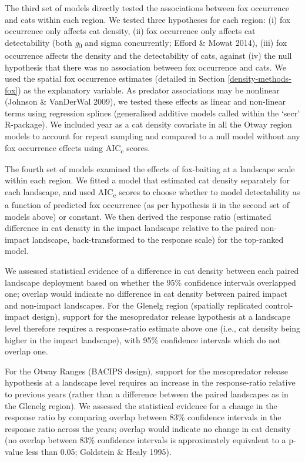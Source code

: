 \documentclass[11pt,a4paper,titlepage,twoside,openright]{style/unimelbthesis}
\begin{document}
\begin{mainmatter}
The third set of models directly tested the associations between fox occurrence and cats within each region. We tested three hypotheses for each region: (i) fox occurrence only affects cat density, (ii) fox occurrence only affects cat detectability (both \emph{g}\textsubscript{0} and sigma concurrently; Efford \& Mowat 2014), (iii) fox occurrence affects the density and the detectability of cats, against (iv) the null hypothesis that there was no association between fox occurrence and cats. We used the spatial fox occurrence estimates (detailed in Section \ref{density-methods-fox}) as the explanatory variable. As predator associations may be nonlinear (Johnson \& VanDerWal 2009), we tested these effects as linear and non-linear terms using regression splines (generalised additive models called within the `secr' R-package). We included year as a cat density covariate in all the Otway region models to account for repeat sampling and compared to a null model without any fox occurrence effects using AIC\textsubscript{c} scores.

The fourth set of models examined the effects of fox-baiting at a landscape scale within each region. We fitted a model that estimated cat density separately for each landscape, and used AIC\textsubscript{c} scores to choose whether to model detectability as a function of predicted fox occurrence (as per hypothesis ii in the second set of models above) or constant. We then derived the response ratio (estimated difference in cat density in the impact landscape relative to the paired non-impact landscape, back-transformed to the response scale) for the top-ranked model.

We assessed statistical evidence of a difference in cat density between each paired landscape deployment based on whether the 95\% confidence intervals overlapped one; overlap would indicate no difference in cat density between paired impact and non-impact landscapes. For the Glenelg region (spatially replicated control-impact design), support for the mesopredator release hypothesis at a landscape level therefore requires a response-ratio estimate above one (i.e., cat density being higher in the impact landscape), with 95\% confidence intervals which do not overlap one.

For the Otway Ranges (BACIPS design), support for the mesopredator release hypothesis at a landscape level requires an increase in the response-ratio relative to previous years (rather than a difference between the paired landscapes as in the Glenelg region). We assessed the statistical evidence for a change in the response ratio by comparing overlap between 83\% confidence intervals in the response ratio across the years; overlap would indicate no change in cat density (no overlap between 83\% confidence intervals is approximately equivalent to a p-value less than 0.05; Goldstein \& Healy 1995).


\end{mainmatter}
\end{document}
